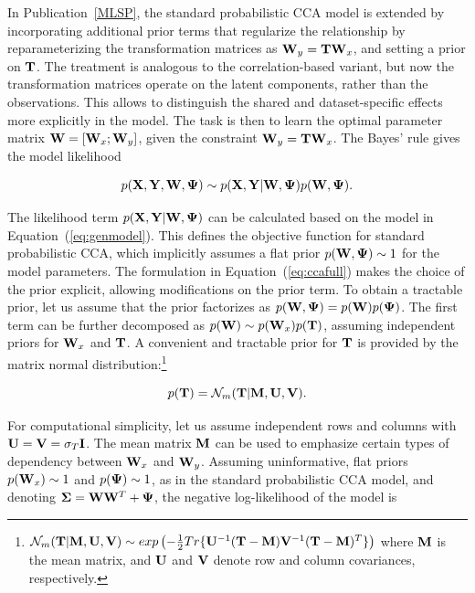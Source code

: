 In Publication~\ref{MLSP}, the standard probabilistic CCA model is
extended by incorporating additional prior terms that regularize the
relationship by reparameterizing the transformation matrices as \(\mathbf{W}_y
= \mathbf{T}\mathbf{W}_x\), and setting a prior on \(\mathbf{T}\). The treatment is analogous
to the correlation-based variant, but now the transformation matrices
operate on the latent components, rather than the observations. This
allows to distinguish the shared and dataset-specific effects more
explicitly in the model. The task is then to learn the optimal
parameter matrix \(\mathbf{W} = [\mathbf{W}_x; \mathbf{W}_y]\), given the constraint \(\mathbf{W}_y =
\mathbf{T}\mathbf{W}_x\). The Bayes' rule gives the model likelihood

\begin{equation}\label{eq:ccafull}
  p(\mathbf{X}, \mathbf{Y}, \mathbf{W}, \mathbf{\Psi}) \sim p(\mathbf{X}, \mathbf{Y} | \mathbf{W}, \mathbf{\Psi}) p(\mathbf{W}, \mathbf{\Psi}).
\end{equation}

\noindent The likelihood term \(p(\mathbf{X}, \mathbf{Y} | \mathbf{W}, \mathbf{\Psi})\) can be
calculated based on the model in Equation~(\ref{eq:genmodel}). This
defines the objective function for standard probabilistic CCA, which
implicitly assumes a flat prior \(p(\mathbf{W}, \mathbf{\Psi}) \sim 1\) for the model
parameters. The formulation in Equation~(\ref{eq:ccafull}) makes the
choice of the prior explicit, allowing modifications on the prior
term. To obtain a tractable prior, let us assume that the prior
factorizes as \(p(\mathbf{W}, \mathbf{\Psi}) = p( \mathbf{W} ) p( \mathbf{\Psi} )\). The first term
can be further decomposed as \(p(\mathbf{W}) \sim p(\mathbf{W}_x) p(\mathbf{T})\), assuming
independent priors for \(\mathbf{W}_x\) and \(\mathbf{T}\). A convenient and tractable
prior for \(\mathbf{T}\) is provided by the matrix normal
distribution:\footnote{\(\mathcal{N}_m(\mathbf{T} | \mathbf{M}, \mathbf{U}, \mathbf{V}) \sim
  exp\left(-\frac{1}{2} Tr\{\mathbf{U}^{-1}(\mathbf{T}-\mathbf{M})\mathbf{V}^{-1}(\mathbf{T} -
    \mathbf{M})^T\}\right)\) where \(\mathbf{M}\) is the mean matrix, and \(\mathbf{U}\) and
  \(\mathbf{V}\) denote row and column covariances, respectively.}

\begin{equation}\label{eq:Nm}
  p(\mathbf{T}) = \mathcal{N}_m(\mathbf{T} | \mathbf{M}, \mathbf{U}, \mathbf{V}).
\end{equation}

\noindent For computational simplicity, let us assume independent rows
and columns with \(\mathbf{U} = \mathbf{V} = \sigma_T \mathbf{I}\). The mean matrix \(\mathbf{M}\)
can be used to emphasize certain types of dependency between \(\mathbf{W}_x\)
and \(\mathbf{W}_y\). Assuming uninformative, flat priors \(p(\mathbf{W}_x) \sim 1\) and
\(p(\mathbf{\Psi}) \sim 1\), as in the standard probabilistic CCA model, and
denoting \(\boldsymbol{\Sigma} = \mathbf{W}\mathbf{W}^T + \mathbf{\Psi} \), the negative log-likelihood of
the model is

